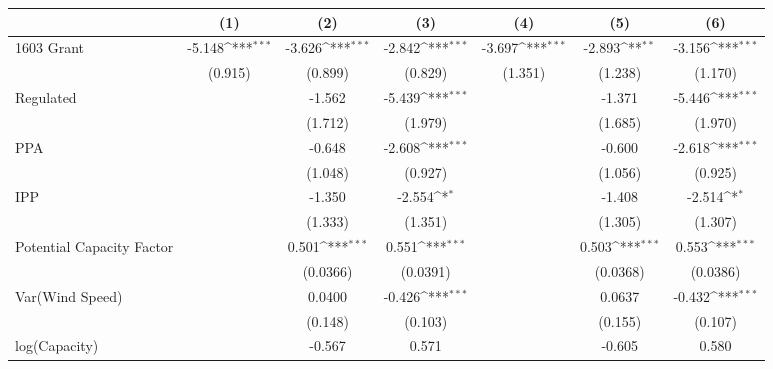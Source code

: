{
\def\sym#1{\ifmmode^{#1}\else\(^{#1}\)\fi}
\begin{tabular}{l*{6}{c}}
\toprule
                &\multicolumn{1}{c}{(1)}         &\multicolumn{1}{c}{(2)}         &\multicolumn{1}{c}{(3)}         &\multicolumn{1}{c}{(4)}         &\multicolumn{1}{c}{(5)}         &\multicolumn{1}{c}{(6)}         \\
\midrule
1603 Grant      &   -5.148\sym{***}&   -3.626\sym{***}&   -2.842\sym{***}&   -3.697\sym{***}&   -2.893\sym{**} &   -3.156\sym{***}\\
                &  (0.915)         &  (0.899)         &  (0.829)         &  (1.351)         &  (1.238)         &  (1.170)         \\
\addlinespace
Regulated       &                  &   -1.562         &   -5.439\sym{***}&                  &   -1.371         &   -5.446\sym{***}\\
                &                  &  (1.712)         &  (1.979)         &                  &  (1.685)         &  (1.970)         \\
\addlinespace
PPA             &                  &   -0.648         &   -2.608\sym{***}&                  &   -0.600         &   -2.618\sym{***}\\
                &                  &  (1.048)         &  (0.927)         &                  &  (1.056)         &  (0.925)         \\
\addlinespace
IPP             &                  &   -1.350         &   -2.554\sym{*}  &                  &   -1.408         &   -2.514\sym{*}  \\
                &                  &  (1.333)         &  (1.351)         &                  &  (1.305)         &  (1.307)         \\
\addlinespace
Potential Capacity Factor&                  &    0.501\sym{***}&    0.551\sym{***}&                  &    0.503\sym{***}&    0.553\sym{***}\\
                &                  & (0.0366)         & (0.0391)         &                  & (0.0368)         & (0.0386)         \\
\addlinespace
Var(Wind Speed) &                  &   0.0400         &   -0.426\sym{***}&                  &   0.0637         &   -0.432\sym{***}\\
                &                  &  (0.148)         &  (0.103)         &                  &  (0.155)         &  (0.107)         \\
\addlinespace
log(Capacity)   &                  &   -0.567         &    0.571         &                  &   -0.605         &    0.580         \\

\end{tabular}}
